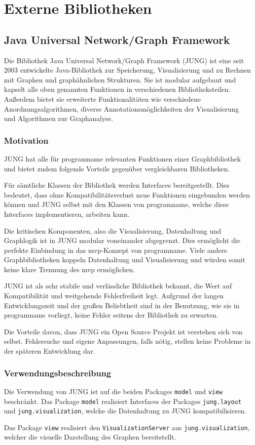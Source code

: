 \section{Externe Bibliotheken}
\subsection{Java Universal Network/Graph Framework}
Die Bibliothek Java Universal Network/Graph Framework (JUNG) ist eine seit 2003 entwickelte Java-Bibliothek zur Speicherung, Visualisierung und zu Rechnen mit Graphen und graphähnlichen Strukturen. Sie ist modular aufgebaut und kapselt alle oben genannten Funktionen in verschiedenen Bibliotheksteilen. Außerdem bietet sie erweiterte Funktionalitäten wie verschiedene Anordnungsalgorithmen, diverse Annotationsmöglichkeiten der Visualisierung und Algorithmen zur Graphanalyse.
\subsubsection{Motivation}
JUNG hat alle für \gls{programname} relevanten Funktionen einer Graphbibliothek und bietet zudem folgende Vorteile gegenüber vergleichbaren Bibliotheken.

Für sämtliche Klassen der Bibliothek werden Interfaces bereitgestellt. Dies bedeutet, dass ohne Kompatibilitätsverlust neue Funktionen eingebunden werden können und JUNG selbst mit den Klassen von \gls{programname}, welche diese Interfaces implementieren, arbeiten kann.

Die kritischen Komponenten, also die Visualisierung, Datenhaltung und Graphlogik ist in JUNG modular voneinander abgegrenzt. Dies ermöglicht die perfekte Einbindung in das \gls{mvp}-Konzept von \gls{programname}. Viele andere Graphbibliotheken koppeln Datenhaltung und Visualisierung und würden somit keine klare Trennung des \gls{mvp} ermöglichen.

JUNG ist als sehr stabile und verlässliche Bibliothek bekannt, die Wert auf Kompatibilität und weitgehende Fehlerfreiheit legt. Aufgrund der langen Entwicklungszeit und der großen Beliebtheit sind in der Benutzung, wie sie in \gls{programname} vorliegt, keine Fehler seitens der Bibliothek zu erwarten.

Die Vorteile davon, dass JUNG ein Open Source Projekt ist verstehen sich von selbst. Fehlersuche und eigene Anpassungen, falls nötig, stellen keine Probleme in der späteren Entwicklung dar.

\subsubsection{Verwendungsbeschreibung}

Die Verwendung von JUNG ist auf die beiden Packages \texttt{model} und  \texttt{view} beschränkt. Das Package \texttt{model} realisiert Interfaces der Packages \texttt{jung.layout} und \texttt{jung.visualization}, welche die Datenhaltung zu JUNG kompatibilisieren.

Das Package \texttt{view} realisiert den \texttt{VisualizationServer} aus \texttt{jung.visualization}, welcher die visuelle Darstellung des Graphen bereitstellt.
